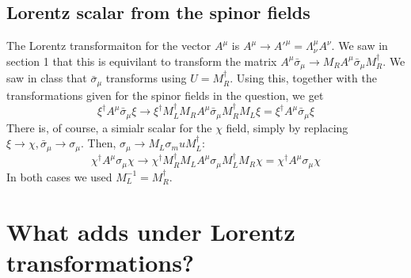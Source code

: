\documentclass{article}
\begin{document}
\subsection{Lorentz scalar from the spinor fields}
The Lorentz transformaiton for the vector $A^\mu$ is $A^\mu \rightarrow A'^\mu = \Lambda^\mu_\nu A^\nu$. We saw in section 1 that this is equivilant to transform the matrix $A^\mu \bar{\sigma}_\mu \rightarrow M_R A^\mu \bar{\sigma}_\mu M_R^\dagger$. We saw in class that $\bar{\sigma}_\mu$ transforms using $U = M_R^\dagger$. Using this, together with the transformations given for the spinor fields in the question, we get
\begin{equation}
    \xi^\dagger A^\mu \bar{\sigma}_\mu \xi \rightarrow
    \xi^\dagger M_L^\dagger M_R A^\mu \bar{\sigma}_\mu M_R^\dagger M_L\xi = \xi^\dagger A^\mu \bar{\sigma}_\mu \xi
\end{equation}
There is, of course, a simialr scalar for the $\chi$ field, simply by replacing $\xi \rightarrow \chi, \bar{\sigma}_\mu \rightarrow \sigma_\mu$. Then, $\sigma_\mu \rightarrow M_L \sigma_mu M_L^\dagger$:
\begin{equation}
    \chi^\dagger A^\mu \sigma_\mu \chi \rightarrow
    \chi^\dagger M_R^\dagger M_L A^\mu \sigma_\mu M_L^\dagger M_R\chi = \chi^\dagger A^\mu \sigma_\mu \chi
\end{equation}
In both cases we used $M_L^{-1} = M_R^\dagger$.

\section{What adds under Lorentz transformations?}
\end{document}
